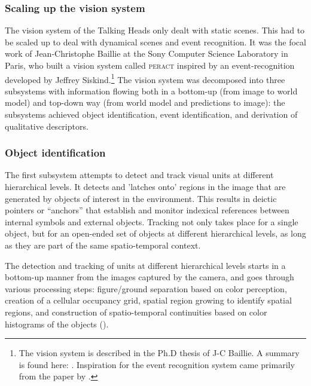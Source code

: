 \subsubsection{Scaling up the vision system}
The vision system of the Talking Heads only dealt with static scenes. This had to be scaled up to
deal with dynamical scenes and event recognition. It was the focal work of 
Jean-Christophe Baillie at the Sony Computer Science Laboratory in Paris, who built a vision system 
called \textsc{peract}  inspired by an event-recognition developed by Jeffrey 
Siskind.\footnote{The vision system is described in the Ph.D thesis of J-C Baillie. A summary is found here: 
\cite{Steels:2003}. Inspiration for the event recognition system came 
primarily from the paper by \cite{Siskind:2000}.}
The vision system was decomposed into three subsystems with information flowing both in a bottom-up
(from image to world model) and top-down way (from world model and predictions to image): the subsystems achieved 
object identification, event identification, and derivation of qualitative descriptors. 

\subsubsection{Object identification} The first subsystem attempts to detect and track visual units at different hierarchical levels. 
It detects and 'latches onto' regions in the image that are generated by objects of 
interest in the environment. This results in deictic pointers or ``anchors'' that establish and monitor indexical references 
between internal symbols and external objects. Tracking not only takes place for a single object, but for 
an open-ended set of objects at different hierarchical levels, as long as they are part of the same spatio-temporal context. 

The detection and tracking of units at different hierarchical levels starts in a bottom-up manner from the images captured by the camera, and goes through various processing steps: figure/ground separation based on color perception, creation of a cellular occupancy grid, spatial region growing to identify spatial regions, and construction of spatio-temporal continuities based on 
color histograms of the objects (). 

